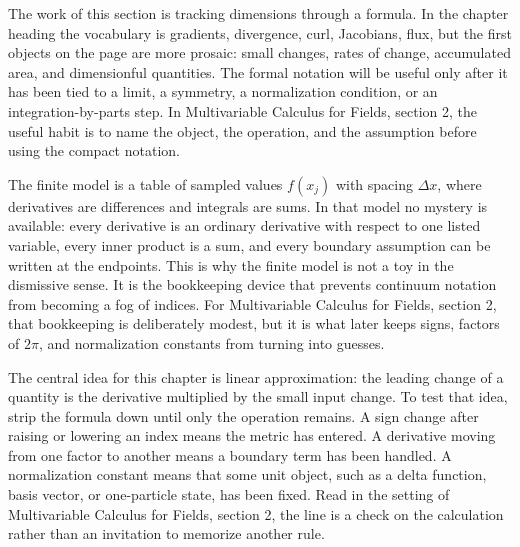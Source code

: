 











The work of this section is tracking dimensions through a formula.  In the chapter heading the vocabulary is gradients, divergence, curl, Jacobians, flux, but the first objects on the page are more prosaic: small changes, rates of change, accumulated area, and dimensionful quantities.  The formal notation will be useful only after it has been tied to a limit, a symmetry, a normalization condition, or an integration-by-parts step.  In Multivariable Calculus for Fields, section 2, the useful habit is to name the object, the operation, and the assumption before using the compact notation.

The finite model is a table of sampled values \(f(x_j)\) with spacing \(\Delta x\), where derivatives are differences and integrals are sums.  In that model no mystery is available: every derivative is an ordinary derivative with respect to one listed variable, every inner product is a sum, and every boundary assumption can be written at the endpoints.  This is why the finite model is not a toy in the dismissive sense.  It is the bookkeeping device that prevents continuum notation from becoming a fog of indices.  For Multivariable Calculus for Fields, section 2, that bookkeeping is deliberately modest, but it is what later keeps signs, factors of \(2\pi\), and normalization constants from turning into guesses.

The central idea for this chapter is linear approximation: the leading change of a quantity is the derivative multiplied by the small input change.  To test that idea, strip the formula down until only the operation remains.  A sign change after raising or lowering an index means the metric has entered.  A derivative moving from one factor to another means a boundary term has been handled.  A normalization constant means that some unit object, such as a delta function, basis vector, or one-particle state, has been fixed.  Read in the setting of Multivariable Calculus for Fields, section 2, the line is a check on the calculation rather than an invitation to memorize another rule.

